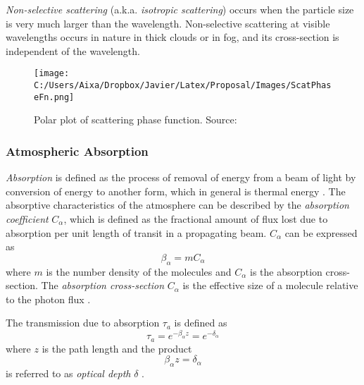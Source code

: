 {\it Non-selective scattering} (a.k.a. {\it isotropic scattering}) occurs when the particle size is very much larger than the wavelength. Non-selective scattering at visible wavelengths occurs in nature in thick clouds or in fog, and its cross-section is independent of the wavelength. 

\begin{figure}[htb]
  \centering
      \texttt{[image: C:/Users/Aixa/Dropbox/Javier/Latex/Proposal/Images/ScatPhaseFn.png]}
  \caption{Polar plot of scattering phase function. Source: \cite{Schott}}
  \label{fig:ScatPhFn}
\end{figure}

\subsubsection*{Atmospheric Absorption}
{\it Absorption} is defined as the process of removal of energy from a beam of light by conversion of energy to another form, which in general is thermal energy \cite{Schott}. The absorptive characteristics of the atmosphere can be described by the {\it absorption coefficient} $C_\alpha$, which is defined as the fractional amount of flux lost due to absorption per unit length of transit in a propagating beam. $C_\alpha$ can be expressed as
\begin{equation}
  \beta_\alpha = mC_\alpha
\end{equation}
where $m$ is the number density of the molecules and $C_\alpha$ is the absorption cross-section. The {\it absorption cross-section} $C_\alpha$ is the effective size of a molecule relative to the photon flux \cite{Schott}.

The transmission due to absorption $\tau_a$ is defined as
\begin{equation}
  \tau_a = e^{-\beta_\alpha z} = e^{-\delta_\alpha}
\end{equation}
where $z$ is the path length and the product 
\begin{equation}
  \beta_\alpha z=\delta_\alpha
\end{equation}
is referred to as {\it optical depth} $\delta$ \cite{Schott}.


